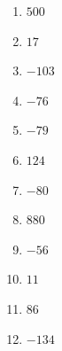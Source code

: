 %
%
    \begin{enumerate}[cols=4]
        \item \(500\)
        \item \(17\)
        \item \(-103\)
        \item \(-76\)
        \item \(-79\)
        \item \(124\)
        \item \(-80\)
        \item \(880\)
        \item \(-56\)
        \item \(11\)
        \item \(86\)
        \item \(-134\)
    \end{enumerate}
